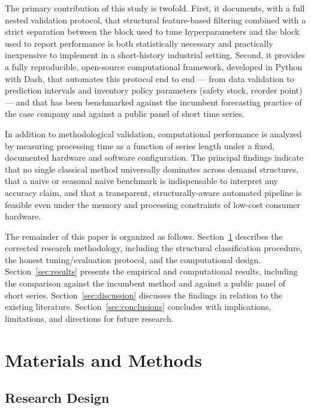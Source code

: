 \documentclass[forecasting,article,submit,pdftex,moreauthors]{Definitions/mdpi}
\begin{document}
The primary contribution of this study is twofold. First, it documents, with a full nested validation protocol, that structural feature-based filtering combined with a strict separation between the block used to tune hyperparameters and the block used to report performance is both statistically necessary and practically inexpensive to implement in a short-history industrial setting. Second, it provides a fully reproducible, open-source computational framework, developed in Python with Dash, that automates this protocol end to end --- from data validation to prediction intervals and inventory policy parameters (safety stock, reorder point) --- and that has been benchmarked against the incumbent forecasting practice of the case company and against a public panel of short time series.

In addition to methodological validation, computational performance is analyzed by measuring processing time as a function of series length under a fixed, documented hardware and software configuration. The principal findings indicate that no single classical method universally dominates across demand structures, that a naive or seasonal naive benchmark is indispensable to interpret any accuracy claim, and that a transparent, structurally-aware automated pipeline is feasible even under the memory and processing constraints of low-cost consumer hardware.

The remainder of this paper is organized as follows. Section~\ref{sec:methods} describes the corrected research methodology, including the structural classification procedure, the honest tuning/evaluation protocol, and the computational design. Section~\ref{sec:results} presents the empirical and computational results, including the comparison against the incumbent method and against a public panel of short series. Section~\ref{sec:discussion} discusses the findings in relation to the existing literature. Section~\ref{sec:conclusions} concludes with implications, limitations, and directions for future research.

\section{Materials and Methods}
\label{sec:methods}

\subsection{Research Design}
\end{document}
